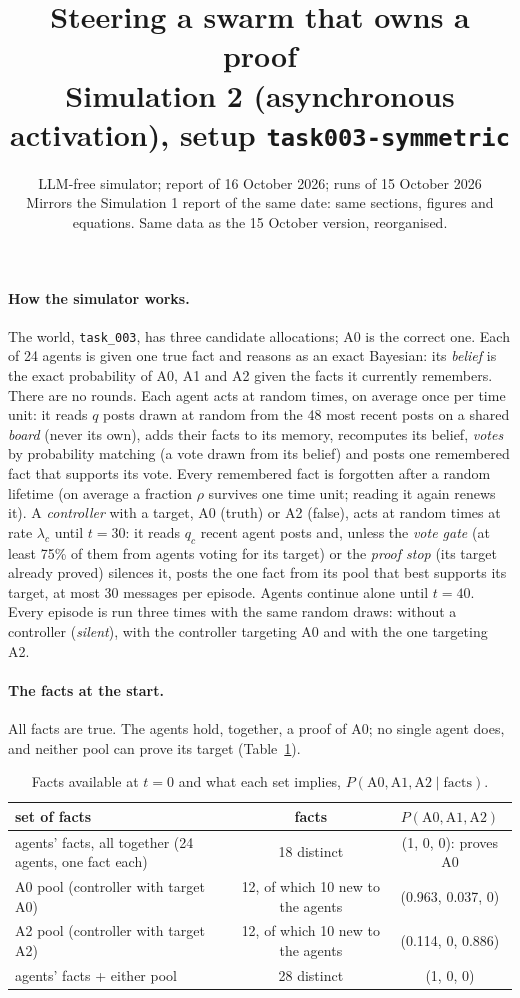 \documentclass[10pt,a4paper]{article}
\title{\vspace{-1.2cm}\textbf{Steering a swarm that owns a proof}\\[2pt]
\large Simulation 2 (asynchronous activation), setup \texttt{task003-symmetric}}
\author{LLM-free simulator; report of 16 October 2026; runs of 15 October 2026\\
\small Mirrors the Simulation 1 report of the same date: same sections, figures and equations. Same data as the 15 October version, reorganised.}
\date{}
\begin{document}
\maketitle
\vspace{-1cm}

\paragraph{How the simulator works.} The world, \texttt{task\_003}, has three candidate allocations; A0 is the
correct one. Each of 24 agents is given one true fact and reasons as an exact Bayesian: its \emph{belief} is the
exact probability of A0, A1 and A2 given the facts it currently remembers. There are no rounds. Each agent acts
at random times, on average once per time unit: it reads $q$ posts drawn at random from the 48 most recent posts
on a shared \emph{board} (never its own), adds their facts to its memory, recomputes its belief, \emph{votes} by
probability matching (a vote drawn from its belief) and posts one remembered fact that supports its vote. Every
remembered fact is forgotten after a random lifetime (on average a fraction $\rho$ survives one time unit; reading
it again renews it). A \emph{controller} with a target, A0 (truth) or A2 (false), acts at random times at rate
$\lambda_c$ until $t = 30$: it reads $q_c$ recent agent posts and, unless the \emph{vote gate} (at least 75\% of
them from agents voting for its target) or the \emph{proof stop} (its target already proved) silences it, posts
the one fact from its pool that best supports its target, at most 30 messages per episode. Agents continue
alone until $t = 40$. Every episode is run three times with the same random draws: without a controller
(\emph{silent}), with the controller targeting A0 and with the one targeting A2.

\paragraph{The facts at the start.} All facts are true. The agents hold, together, a proof of A0; no single
agent does, and neither pool can prove its target (Table~\ref{tab:facts}).

\begin{table}[H]
\centering\small
\caption{Facts available at $t = 0$ and what each set implies, $P(\text{A0}, \text{A1}, \text{A2} \mid \text{facts})$.}
\label{tab:facts}
\begin{tabular}{lcc}
\toprule
set of facts & facts & $P(\text{A0}, \text{A1}, \text{A2})$ \\
\midrule
agents' facts, all together (24 agents, one fact each) & 18 distinct & (1, 0, 0): proves A0 \\
A0 pool (controller with target A0) & 12, of which 10 new to the agents & (0.963, 0.037, 0) \\
A2 pool (controller with target A2) & 12, of which 10 new to the agents & (0.114, 0, 0.886) \\
agents' facts + either pool & 28 distinct & (1, 0, 0) \\
\bottomrule
\end{tabular}
\end{table}
\end{document}
